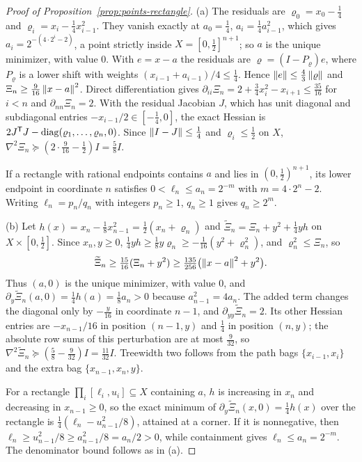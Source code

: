 \begin{proof}[Proof of Proposition~\ref{prop:points-rectangle}]
(a) The residuals are $\varrho_0=x_0-\frac14$ and
$\varrho_i=x_i-\frac14x_{i-1}^2$. They vanish exactly at
$a_0=\frac14$, $a_i=\frac14a_{i-1}^2$, which gives
$a_i=2^{-(4\cdot2^i-2)}$, a point strictly inside $X=[0,\frac12]^{n+1}$; so
$a$ is the unique minimizer, with value $0$. With $e=x-a$ the residuals are
$\varrho=(I-P_\varrho)e$, where $P_\varrho$ is a lower shift with weights
$(x_{i-1}+a_{i-1})/4\le\frac14$. Hence $\left\lVert e\right\rVert\le\frac43\left\lVert\varrho\right\rVert$ and
$\Xi_n\ge\frac9{16}\left\lVert x-a\right\rVert^2$. Direct differentiation gives
$\partial_{ii}\Xi_n=2+\frac34x_i^2-x_{i+1}\le\frac{35}{16}$ for $i<n$ and
$\partial_{nn}\Xi_n=2$. With the residual Jacobian $J$, which has unit diagonal
and subdiagonal entries $-x_{i-1}/2\in[-\frac14,0]$, the exact Hessian is
$2J^{\mathsf T}J-\operatorname{diag}(\varrho_1,\ldots,\varrho_n,0)$. Since
$\left\lVert I-J\right\rVert\le\frac14$ and $\varrho_i\le\frac12$ on $X$,
$\nabla^2\Xi_n\succeq(2\cdot\frac9{16}-\frac12)I=\frac58I$.

If a rectangle with rational endpoints contains $a$ and lies in
$(0,\frac12)^{n+1}$, its lower endpoint in coordinate $n$ satisfies
$0<\ell_n\le a_n=2^{-m}$ with $m=4\cdot2^n-2$. Writing $\ell_n=p_n/q_n$ with
integers $p_n\ge1$, $q_n\ge1$ gives $q_n\ge2^m$.

(b) Let $h(x)=x_n-\frac18x_{n-1}^2=\frac12(x_n+\varrho_n)$ and
$\widetilde\Xi_n=\Xi_n+y^2+\frac14yh$ on $X\times[0,\frac12]$. Since $x_n,y\ge0$,
$\frac14yh\ge\frac18y\varrho_n\ge-\frac1{16}(y^2+\varrho_n^2)$, and
$\varrho_n^2\le\Xi_n$, so
\[
 \widetilde\Xi_n\ge\tfrac{15}{16}(\Xi_n+y^2)\ge\tfrac{135}{256}
 \bigl(\left\lVert x-a\right\rVert^2+y^2\bigr).
\]
Thus $(a,0)$ is the unique minimizer, with value $0$, and
$\partial_y\widetilde\Xi_n(a,0)=\frac14h(a)=\frac18a_n>0$ because
$a_{n-1}^2=4a_n$. The added term changes the diagonal only by
$-\frac y{16}$ in coordinate $n-1$, and $\partial_{yy}\widetilde\Xi_n=2$. Its
other Hessian entries are $-x_{n-1}/16$ in position $(n-1,y)$ and
$\frac14$ in position $(n,y)$; the absolute row sums of this perturbation are
at most $\frac9{32}$, so $\nabla^2\widetilde\Xi_n\succeq(\frac58-\frac9{32})I=
\frac{11}{32}I$. Treewidth two follows from the path bags
$\{x_{i-1},x_i\}$ and the extra bag $\{x_{n-1},x_n,y\}$.

For a rectangle $\prod_i[\ell_i,u_i]\subseteq X$ containing $a$,
$h$ is increasing in $x_n$ and decreasing in $x_{n-1}\ge0$, so the exact
minimum of $\partial_y\widetilde\Xi_n(x,0)=\frac14h(x)$ over the rectangle is
$\frac14(\ell_n-u_{n-1}^2/8)$, attained at a corner. If it is nonnegative,
then $\ell_n\ge u_{n-1}^2/8\ge a_{n-1}^2/8=a_n/2>0$, while containment gives
$\ell_n\le a_n=2^{-m}$. The denominator bound follows as in (a).


\end{proof}
